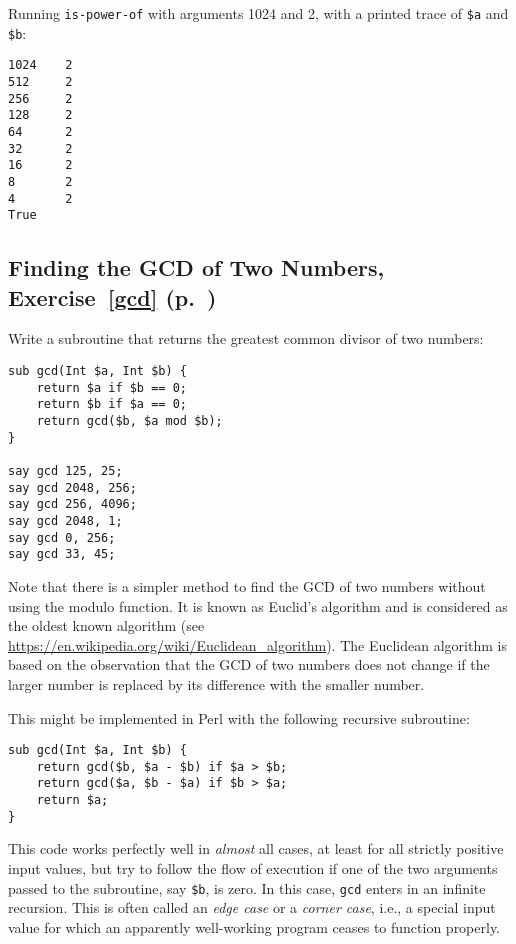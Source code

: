 Running {\tt is-power-of} with arguments 1024 and 2, 
with a printed trace of \verb'$a' and \verb'$b':

\begin{verbatim}
1024    2
512     2
256     2
128     2
64      2
32      2
16      2
8       2
4       2
True
\end{verbatim}
%

\subsection{Finding the GCD of Two Numbers, Exercise~\ref{gcd} (p.~\pageref{gcd})}
\label{sol_gcd}

Write a subroutine that returns the greatest common divisor of two numbers:

\begin{verbatim}
sub gcd(Int $a, Int $b) {
    return $a if $b == 0;
    return $b if $a == 0;
    return gcd($b, $a mod $b);
}

say gcd 125, 25;
say gcd 2048, 256;
say gcd 256, 4096;
say gcd 2048, 1;
say gcd 0, 256;
say gcd 33, 45;
\end{verbatim}

Note that there is a simpler method to find the GCD of 
two numbers without using the modulo function. It is known
as Euclid's algorithm and is considered as the oldest known 
algorithm (see \url{https://en.wikipedia.org/wiki/Euclidean_algorithm}). The Euclidean algorithm is based on 
the observation that the GCD of two numbers does not change 
if the larger number is replaced by its difference with 
the smaller number.

This might be implemented in Perl with the following recursive 
subroutine:

\begin{verbatim}
sub gcd(Int $a, Int $b) { 
    return gcd($b, $a - $b) if $a > $b;
    return gcd($a, $b - $a) if $b > $a;
    return $a;
}
\end{verbatim}
%

This code works perfectly well in \emph{almost} all cases, 
at least for all strictly positive input values, 
but try to follow the flow of execution if one of the 
two arguments passed to the subroutine, say {\tt \$b}, 
is zero. In this case, {\tt gcd} enters in an infinite 
recursion. This is often called an \emph{edge case} or a 
\emph{corner case}, i.e., a special input value for which 
an apparently well-working program ceases to function properly.

